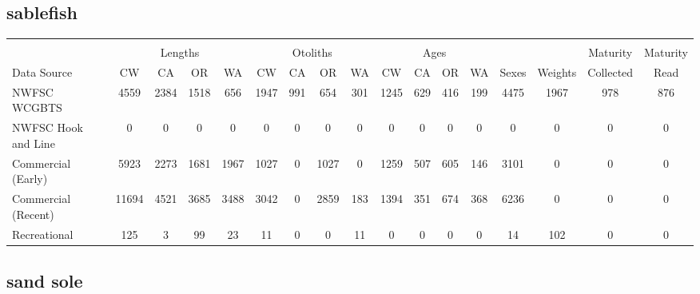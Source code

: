 \documentclass[12pt,]{article}
\begin{document}
\FloatBarrier  

\subsection{sablefish}\label{sablefish}

\begin{table}[ht]
\centering
\begingroup\fontsize{10pt}{10pt}\selectfont
\begin{tabular}{|l|cccc|cccc|cccc|c|c|c|c|}
  \hline
 &  &  &  &  &  &  &  &  &  &  &  &  &  &  &  &  \\ 
   & \multicolumn{4}{c}{Lengths} &  \multicolumn{4}{c}{Otoliths} & \multicolumn{4}{c}{Ages} &  & & Maturity & Maturity\\
 Data Source & CW & CA & OR & WA & CW & CA & OR & WA & CW & CA & OR & WA & Sexes & Weights & Collected & Read\\
 \hline
NWFSC WCGBTS & 4559 & 2384 & 1518 & 656 & 1947 & 991 & 654 & 301 & 1245 & 629 & 416 & 199 & 4475 & 1967 & 978 & 876 \\ 
  NWFSC Hook and Line & 0 & 0 & 0 & 0 & 0 & 0 & 0 & 0 & 0 & 0 & 0 & 0 & 0 & 0 & 0 & 0 \\ 
  Commercial (Early) & 5923 & 2273 & 1681 & 1967 & 1027 & 0 & 1027 & 0 & 1259 & 507 & 605 & 146 & 3101 & 0 & 0 & 0 \\ 
  Commercial (Recent) & 11694 & 4521 & 3685 & 3488 & 3042 & 0 & 2859 & 183 & 1394 & 351 & 674 & 368 & 6236 & 0 & 0 & 0 \\ 
  Recreational & 125 & 3 & 99 & 23 & 11 & 0 & 0 & 11 & 0 & 0 & 0 & 0 & 14 & 102 & 0 & 0 \\ 
   \hline
\end{tabular}
\endgroup
\end{table}

\FloatBarrier  

\subsection{sand sole}\label{sand-sole}
\end{document}
